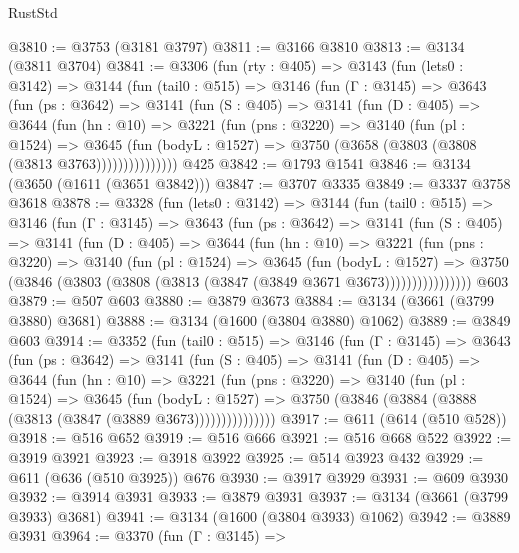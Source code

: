 \begin{lexlean}{RustStd}
\begin{coremodule}
@3810 := @3753 (@3181 @3797)
@3811 := @3166 @3810
@3813 := @3134 (@3811 @3704)
@3841 := @3306
    (fun (rty : @405) =>
    @3143
      (fun (lets0 : @3142) =>
      @3144
        (fun (tail0 : @515) =>
        @3146
          (fun (Γ : @3145) =>
          @3643
            (fun (ps : @3642) =>
            @3141
              (fun (S : @405) =>
              @3141
                (fun (D : @405) =>
                @3644
                  (fun (hn : @10) =>
                  @3221
                    (fun (pns : @3220) =>
                    @3140
                      (fun (pl : @1524) =>
                      @3645
                        (fun (bodyL : @1527) =>
                        @3750 (@3658 (@3803 (@3808 (@3813 @3763)))))))))))))))
    @425
@3842 := @1793 @1541
@3846 := @3134 (@3650 (@1611 (@3651 @3842)))
@3847 := @3707 @3335
@3849 := @3337 @3758 @3618
@3878 := @3328
    (fun (lets0 : @3142) =>
    @3144
      (fun (tail0 : @515) =>
      @3146
        (fun (Γ : @3145) =>
        @3643
          (fun (ps : @3642) =>
          @3141
            (fun (S : @405) =>
            @3141
              (fun (D : @405) =>
              @3644
                (fun (hn : @10) =>
                @3221
                  (fun (pns : @3220) =>
                  @3140
                    (fun (pl : @1524) =>
                    @3645
                      (fun (bodyL : @1527) =>
                      @3750 (@3846 (@3803 (@3808 (@3813 (@3847 (@3849 @3671 @3673))))))))))))))))
    @603
@3879 := @507 @603
@3880 := @3879 @3673
@3884 := @3134 (@3661 (@3799 @3880) @3681)
@3888 := @3134 (@1600 (@3804 @3880) @1062)
@3889 := @3849 @603
@3914 := @3352
    (fun (tail0 : @515) =>
    @3146
      (fun (Γ : @3145) =>
      @3643
        (fun (ps : @3642) =>
        @3141
          (fun (S : @405) =>
          @3141
            (fun (D : @405) =>
            @3644
              (fun (hn : @10) =>
              @3221
                (fun (pns : @3220) =>
                @3140
                  (fun (pl : @1524) =>
                  @3645
                    (fun (bodyL : @1527) =>
                    @3750 (@3846 (@3884 (@3888 (@3813 (@3847 (@3889 @3673)))))))))))))))
@3917 := @611 (@614 (@510 @528))
@3918 := @516 @652
@3919 := @516 @666
@3921 := @516 @668 @522
@3922 := @3919 @3921
@3923 := @3918 @3922
@3925 := @514 @3923 @432
@3929 := @611 (@636 (@510 @3925)) @676
@3930 := @3917 @3929
@3931 := @609 @3930
@3932 := @3914 @3931
@3933 := @3879 @3931
@3937 := @3134 (@3661 (@3799 @3933) @3681)
@3941 := @3134 (@1600 (@3804 @3933) @1062)
@3942 := @3889 @3931
@3964 := @3370
    (fun (Γ : @3145) =>

\end{coremodule}
\end{lexlean}
